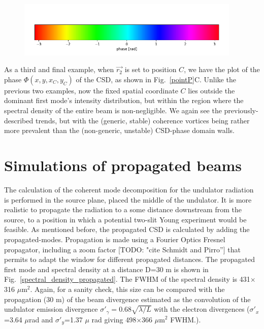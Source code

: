 \documentclass{iucr}              %
\newcommand{\todo}[1]{{\color{red}[TODO: "#1'']}}
\newcommand{\inblue}[1]{{\color{blue}#1}}
\begin{document}
\begin{figure}
\includegraphics[width=0.95\textwidth]{Figures/color_bar.png}
\end{figure}

As a third and final example, when $\vec{r_2}$ is set to position $C$, we have the plot of the phase $\Phi(x,y,x_C,y_C)$ of the CSD, as shown in \inblue{Fig.~\ref{pointP}C}.  Unlike the previous two examples, now the fixed spatial coordinate $C$ lies outside the dominant first mode's intensity distribution, but within the region where the spectral density of the entire beam is non-negligible.  We again see the previously-described trends, but with the (generic, stable) coherence vortices being rather more prevalent than the (non-generic, unstable) CSD-phase domain walls.    


\section{Simulations of propagated beams}

The calculation of the coherent mode decomposition for the undulator radiation is performed in the source plane, placed the middle of the undulator. It is more realistic to propagate the radiation to a some distance downstream from the source, to a position in which a potential two-slit Young experiment would be feasible. As mentioned before, the propagated CSD is calculated by adding the propagated-modes. Propagation is made using a Fourier Optics Fresnel propagator, including a zoom factor \todo{cite Schmidt and Pirro} that permits to adapt the window for different propagated distances. The propagated first mode and spectral density at a distance D=30 m is shown in \inblue{Fig.~\ref{spectral_density_propagated}}. The FWHM of the spectral density is 431$\times$316 $\mu$m$^2$. Again, for a sanity check, this size can be compared with the propagation (30 m) of the beam divergence estimated as the convolution of the undulator emission divergence $\sigma'_\gamma=0.68\sqrt{\lambda/L}$ with the electron divergences ($\sigma'_x$=3.64 $\mu$rad and $\sigma'_y$=1.37 $\mu$ rad giving 498$\times$366 $\mu$m$^2$ FWHM.). 
\end{document}
